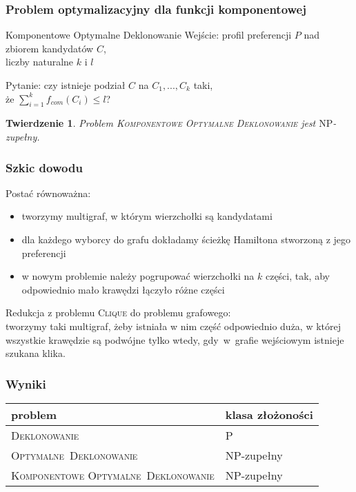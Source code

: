 \documentclass{beamer}
\newtheorem{tw}{Twierdzenie}
\begin{document}
\begin{frame} \frametitle{Problem optymalizacyjny dla funkcji komponentowej}
	\begin{aproblem}{Komponentowe Optymalne Deklonowanie}
		Wejście: profil preferencji $P$ nad zbiorem kandydatów $C$,\\
			liczby naturalne $k$ i $l$

		Pytanie: czy istnieje podział $C$ na $C_1, ..., C_k$ taki, \\
			że $\sum_{i=1}^k f_{com}(C_i) \leq l$?
	\end{aproblem}

	\vfill	
	
	\begin{tw}
		Problem \textsc{Komponentowe Optymalne Deklonowanie} jest $\text{NP}$-zupełny.
	\end{tw}
	
\end{frame}

\begin{frame} \frametitle{Szkic dowodu}	
	Postać równoważna:
	\begin{itemize}
		\item tworzymy multigraf, w którym wierzchołki są kandydatami
		\item dla każdego wyborcy do grafu dokładamy ścieżkę Hamiltona stworzoną z jego preferencji
		\item w nowym problemie należy pogrupować wierzchołki na $k$ części, tak, aby odpowiednio mało
		 	krawędzi łączyło różne części
	\end{itemize}
	\vfill
	Redukcja z problemu \textsc{Clique} do problemu grafowego:\\
	tworzymy taki multigraf, żeby istniała w nim część odpowiednio duża, w której wszystkie krawędzie są podwójne
	tylko wtedy, gdy~w~grafie wejściowym istnieje szukana klika.
\end{frame}


\begin{frame} \frametitle{Wyniki}

\begin{tabularx}{\textwidth}{| X | X |}\hline
	\textbf{problem} & \textbf{klasa złożoności} \\ \hline
	\textsc{Deklonowanie} & P \\ \hline
	\textsc{\mbox{Optymalne Deklonowanie}} & NP-zupełny \\ \hline
	\textsc{Komponentowe \mbox{Optymalne Deklonowanie}} & NP-zupełny \\ \hline
\end{tabularx}

\end{frame}

\frame{\titlepage}
\end{document}

